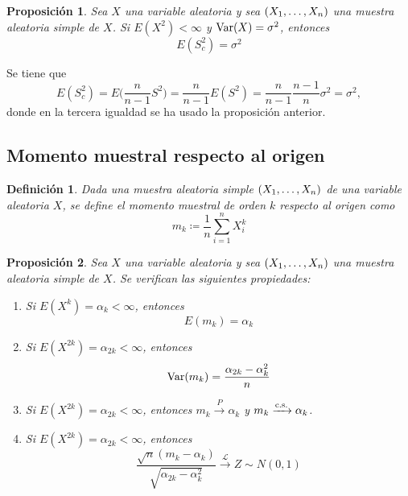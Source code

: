 \documentclass[11pt]{report}
\makeatletter
\renewenvironment{proof}[1][\proofname]{\par
  \pushQED{\qed}%
  \normalfont \topsep\z@skip %
  \trivlist
  \item[\hskip\labelsep
        \itshape
    #1\@addpunct{.}]\ignorespaces
}{%
  \popQED\endtrivlist\@endpefalse
}
\newtheorem{proposition}{Proposición}
\newtheorem{definition}{Definición}
\theoremstyle{definition}
\makeatother
\begin{document}
\begin{proposition}
\label{prop1.12}
Sea $X$ una variable aleatoria y sea $(X_1,\mathellipsis,X_n)$ una muestra aleatoria simple de $X$. Si 
$E(X^2) < \infty$ y $\textup{Var}(X)=\sigma^2$, entonces
\[E(S^2_c) = \sigma^2\]
\end{proposition}

\begin{proof}
Se tiene que
\[E(S^2_c) = E\biggl(\frac{n}{n-1}S^2\biggr) = \frac{n}{n-1}E(S^2) = \frac{n}{n-1} \frac{n-1}{n}\sigma^2 = \sigma^2,\]
donde en la tercera igualdad se ha usado la proposición anterior.
\end{proof}

\subsection{Momento muestral respecto al origen}

\begin{definition}
Dada una muestra aleatoria simple $(X_1,\mathellipsis,X_n)$ de una variable aleatoria $X$, se define el \emph{momento muestral de orden $k$ respecto al origen} como
\[m_k\coloneqq\frac{1}{n}\sum_{i=1}^nX_i^k\]
\end{definition}

\begin{proposition}
Sea $X$ una variable aleatoria y sea $(X_1,\mathellipsis,X_n)$ una muestra aleatoria simple de $X$. Se verifican las siguientes propiedades:
\begin{enumerate}
    \item Si $E(X^k)=\alpha_k< \infty$, entonces \[E(m_k) = \alpha_k\]
    \item Si $E(X^{2k}) = \alpha_{2k} < \infty$, entonces \[\textup{Var}(m_k) = \frac{\alpha_{2k}-\alpha_k^2}{n}\]
    \item Si $E(X^{2k}) = \alpha_{2k} < \infty$, entonces $m_k \xrightarrow{P} \alpha_k$ y $m_k \xrightarrow{\textup{c.s.}} \alpha_k$.
    \item Si $E(X^{2k}) = \alpha_{2k} < \infty$, entonces \[\frac{\sqrt{n}(m_k-\alpha_k)}{\sqrt{\alpha_{2k}-\alpha_k^2}} \xrightarrow{\mathcal{L}}Z \sim N(0,1)\]
\end{enumerate}
\end{proposition}
\end{document}
